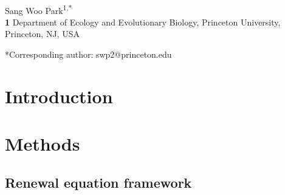 \documentclass[12pt]{article}
\date{\today}
\begin{document}
\begin{flushleft}{
	\Large
	\textbf{}
}
\newline
\\
Sang Woo Park\textsuperscript{1,*}
\\
\bigskip
\textbf{1} Department of Ecology and Evolutionary Biology, Princeton University, Princeton, NJ, USA
\\
\bigskip

*Corresponding author: swp2@princeton.edu
\end{flushleft}


\section{Introduction}

\section{Methods}

\subsection{Renewal equation framework}
\end{document}
